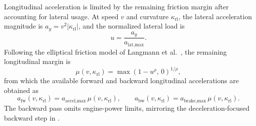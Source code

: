 Longitudinal acceleration is limited by the remaining friction margin after accounting for lateral usage.
At speed $v$ and curvature $\kappa_{\text{rl}}$, the lateral acceleration magnitude is $a_y = v^2 |\kappa_{\text{rl}}|$, and the normalized lateral load is
\begin{equation}
    u = \frac{a_y}{a_{\text{lat,max}}}.
    \label{eq:latUsage}
\end{equation}
Following the elliptical friction model of Langmann et al.\ \cite{langmann_OnlineVelocityProfile_2025}, the remaining longitudinal margin is
\begin{equation}
    \mu(v,\kappa_{\text{rl}}) = \max\!\left(1 - u^{\rho},\, 0\right)^{1/\rho},
    \label{eq:frictionMargin}
\end{equation}
from which the available forward and backward longitudinal accelerations are obtained as
\begin{equation}
    a_{\text{fw}}(v,\kappa_{\text{rl}}) = a_{\text{accel,max}}\, \mu(v,\kappa_{\text{rl}}),
    \qquad
    a_{\text{bw}}(v,\kappa_{\text{rl}}) = a_{\text{brake,max}}\, \mu(v,\kappa_{\text{rl}}).
    \label{eq:longAccelAvail}
\end{equation}
The backward pass omits engine-power limits, mirroring the deceleration-focused backward step in \cite{langmann_OnlineVelocityProfile_2025}.

